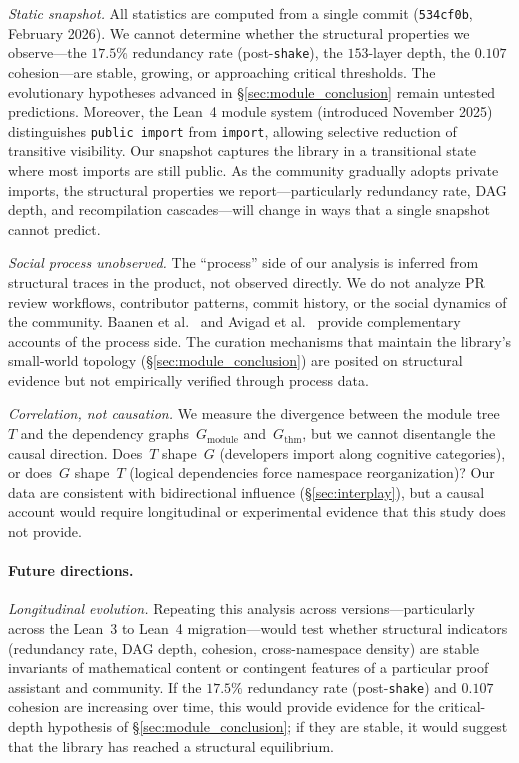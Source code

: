 \emph{Static snapshot.} All statistics are computed from a single commit (\texttt{534cf0b}, February 2026). We cannot determine whether the structural properties we observe---the $17.5\%$ redundancy rate (post-\texttt{shake}), the $153$-layer depth, the $0.107$ cohesion---are stable, growing, or approaching critical thresholds. The evolutionary hypotheses advanced in \S\ref{sec:module_conclusion} remain untested predictions. Moreover, the Lean~4 module system (introduced November 2025) distinguishes \texttt{public import} from \texttt{import}, allowing selective reduction of transitive visibility. Our snapshot captures the library in a transitional state where most imports are still public. As the community gradually adopts private imports, the structural properties we report---particularly redundancy rate, DAG depth, and recompilation cascades---will change in ways that a single snapshot cannot predict.

\emph{Social process unobserved.} The ``process'' side of our analysis is inferred from structural traces in the product, not observed directly. We do not analyze PR review workflows, contributor patterns, commit history, or the social dynamics of the  community. Baanen et al.~\cite{baanen2025} and Avigad et al.~\cite{avigad2025anatomy} provide complementary accounts of the process side. The curation mechanisms that maintain the library's small-world topology (\S\ref{sec:module_conclusion}) are posited on structural evidence but not empirically verified through process data.

\emph{Correlation, not causation.} We measure the divergence between the module tree~$T$ and the dependency graphs~$G_{\mathrm{module}}$ and~$G_{\mathrm{thm}}$, but we cannot disentangle the causal direction. Does~$T$ shape~$G$ (developers import along cognitive categories), or does~$G$ shape~$T$ (logical dependencies force namespace reorganization)? Our data are consistent with bidirectional influence (\S\ref{sec:interplay}), but a causal account would require longitudinal or experimental evidence that this study does not provide.

\paragraph{Future directions.}
\label{sec:future}

\emph{Longitudinal evolution.} Repeating this analysis across  versions---particularly across the Lean~3 to Lean~4 migration---would test whether structural indicators (redundancy rate, DAG depth, cohesion, cross-namespace density) are stable invariants of mathematical content or contingent features of a particular proof assistant and community. If the $17.5\%$ redundancy rate (post-\texttt{shake}) and $0.107$ cohesion are increasing over time, this would provide evidence for the critical-depth hypothesis of \S\ref{sec:module_conclusion}; if they are stable, it would suggest that the library has reached a structural equilibrium.

